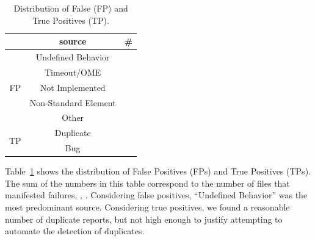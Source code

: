 \documentclass[smallextended]{svjour3}
\begin{document}
\begin{table}
  \centering
  \caption{\label{fig:falsepositives}\label{fig:truepositives}\label{fig:piecharts-transplantation}Distribution
    of False (FP) and True Positives (TP).}
  \renewcommand*{\arraystretch}{0.9}
  \begin{tabular}{ccr}
    \toprule
    & source &  \#\\
    \midrule
    \multirow{5}{*}{FP} & Undefined Behavior & \noTransUndefined{} \\
    & Timeout/OME & \noTransTimeout{} \\
    & Not Implemented & \noTransNotImplemented{} \\
    & Non-Standard Element & \noTransNonStandard{} \\
    & Other & \noTransOther{} \\
    \midrule
    \multirow{2}{*}{TP} & Duplicate & \noTransTPDuplicated{} \\
    & Bug & \noTransTPBugs{} \\
    \bottomrule
  \end{tabular}
\end{table}

Table~\ref{fig:piecharts-transplantation} shows the distribution of
False Positives (FPs) and True Positives (TPs). The sum of the numbers
in this table correspond to the number of files that manifested
failures, \ie{}, \failuresTestTransDistictFiles{}. Considering false
positives, ``Undefined Behavior'' was the most predominant
source. Considering true positives, we found a reasonable number of
duplicate reports, but not high enough to justify attempting to
automate the detection of duplicates.


\end{document}
